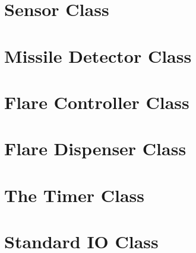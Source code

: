 \documentclass[\pformat,12pt]{article}
\begin{document}


\section{Sensor Class}



\section{Missile Detector Class}



\section{Flare Controller Class}



\section{Flare Dispenser Class}



\section{The Timer Class}



\section{Standard IO Class}



\printindex
{}
\end{document}
